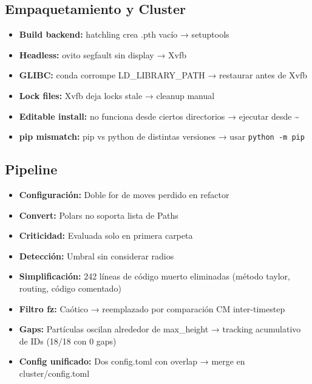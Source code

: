 \documentclass[12pt,a4paper]{article}
\begin{document}
\subsection*{Empaquetamiento y Cluster}
\begin{itemize}[leftmargin=*]
	\item \textbf{Build backend:} hatchling crea .pth vacío → setuptools
	\item \textbf{Headless:} ovito segfault sin display → Xvfb
	\item \textbf{GLIBC:} conda corrompe LD\_LIBRARY\_PATH → restaurar antes de Xvfb
	\item \textbf{Lock files:} Xvfb deja locks stale → cleanup manual
	\item \textbf{Editable install:} no funciona desde ciertos directorios → ejecutar desde \~{}
	\item \textbf{pip mismatch:} pip vs python de distintas versiones → usar \texttt{python -m pip}
\end{itemize}

\subsection*{Pipeline}
\begin{itemize}[leftmargin=*]
	\item \textbf{Configuración:} Doble for de moves perdido en refactor
	\item \textbf{Convert:} Polars no soporta lista de Paths
	\item \textbf{Criticidad:} Evaluada solo en primera carpeta
	\item \textbf{Detección:} Umbral sin considerar radios
	\item \textbf{Simplificación:} 242 líneas de código muerto eliminadas (método taylor, routing, código comentado)
	\item \textbf{Filtro fz:} Caótico → reemplazado por comparación CM inter-timestep
	\item \textbf{Gaps:} Partículas oscilan alrededor de max\_height → tracking acumulativo de IDs (18/18 con 0 gaps)
	\item \textbf{Config unificado:} Dos config.toml con overlap → merge en cluster/config.toml
\end{itemize}
\end{document}
